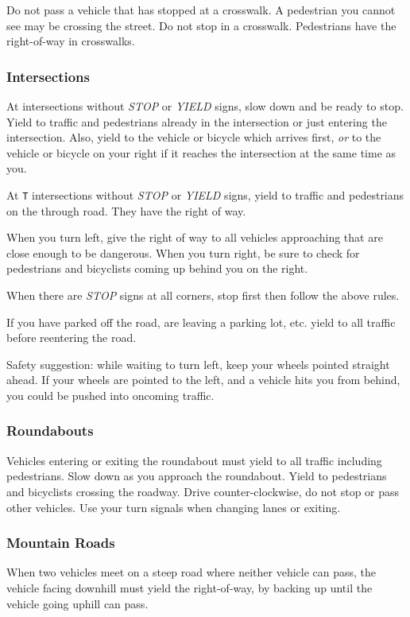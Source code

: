 Do not pass a vehicle that has stopped at a crosswalk.
A pedestrian you cannot see may be crossing the street.
Do not stop in a crosswalk.
Pedestrians have the right-of-way in crosswalks.

\subsubsection{Intersections}
At intersections without \emph{STOP} or \emph{YIELD} signs,
slow down and be ready to stop.
Yield to traffic and pedestrians already in the intersection
or just entering the intersection.
Also, yield to the vehicle or bicycle which arrives first,
\emph{or} to the vehicle or bicycle on your right
if it reaches the intersection at the same time as you.

At \verb=T= intersections without \emph{STOP} or \emph{YIELD} signs,
yield to traffic and pedestrians on the through road.
They have the right of way.

When you turn left, give the right of way to all vehicles approaching
that are close enough to be dangerous.
When you turn right, be sure to check for pedestrians
and bicyclists coming up behind you on the right.

When there are \emph{STOP} signs at all corners,
stop first then follow the above rules.

If you have parked off the road, are leaving a parking lot, etc.
yield to all traffic before reentering the road.

Safety suggestion: while waiting to turn left,
keep your wheels pointed straight ahead.
If your wheels are pointed to the left, and a vehicle hits you from behind,
you could be pushed into oncoming traffic.

\subsubsection{Roundabouts}
Vehicles entering or exiting the roundabout must yield to all traffic
including pedestrians.
Slow down as you approach the roundabout.
Yield to pedestrians and bicyclists crossing the roadway.
Drive counter-clockwise, do not stop or pass other vehicles.
Use your turn signals when changing lanes or exiting.

\subsubsection{Mountain Roads}
When two vehicles meet on a steep road where neither vehicle can pass,
the vehicle facing downhill must yield the right-of-way,
by backing up until the vehicle going uphill can pass.

